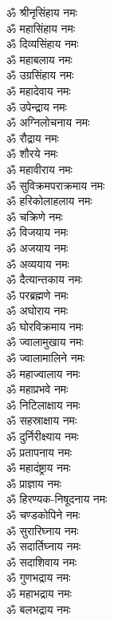 \begin{center}
\begin{multicols}{2}\setlength{\columnseprule}{1pt}
\begin{flushleft}
ॐ श्रीनृसिंहाय नमः\\
ॐ महासिंहाय नमः\\
ॐ दिव्यसिंहाय नमः\\
ॐ महाबलाय नमः\\
ॐ उग्रसिंहाय नमः\\
ॐ महादेवाय नमः\\
ॐ उपेन्द्राय नमः\\
ॐ अग्निलोचनाय नमः\\
ॐ रौद्राय नमः\\
ॐ शौरये नमः\hfill{}\\
ॐ महावीराय नमः\\
ॐ सुविक्रमपराक्रमाय नमः\\
ॐ हरिकोलाहलाय नमः\\
ॐ चक्रिणे नमः\\
ॐ विजयाय नमः\\
ॐ अजयाय नमः\\
ॐ अव्ययाय नमः\\
ॐ दैत्यान्तकाय नमः\\
ॐ परब्रह्मणे नमः\\
ॐ अघोराय नमः\hfill{}\\
ॐ घोरविक्रमाय नमः\\
ॐ ज्वालामुखाय नमः\\
ॐ ज्वालामालिने नमः\\
ॐ महाज्वालाय नमः\\
ॐ महाप्रभवे नमः\\
ॐ निटिलाक्षाय नमः\\
ॐ सहस्राक्षाय नमः\\
ॐ दुर्निरीक्ष्याय नमः\\
ॐ प्रतापनाय नमः\\
ॐ महादंष्ट्राय नमः\hfill{}\\
ॐ प्राज्ञाय नमः\\
ॐ हिरण्यक-निषूदनाय नमः\\
ॐ चण्डकोपिने नमः\\
ॐ सुरारिघ्नाय नमः\\
ॐ सदार्तिघ्नाय नमः\\
ॐ सदाशिवाय नमः\\
ॐ गुणभद्राय नमः\\
ॐ महाभद्राय नमः\\
ॐ बलभद्राय नमः\\

\end{flushleft}
\end{multicols}
\end{center}
